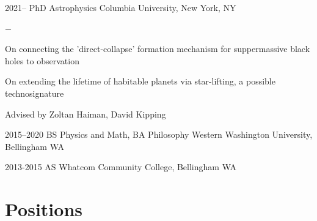 \documentclass[]{scoggins-cv} %
\begin{document}
\begin{entrylist}


    \entry
    {2021--}
    {PhD {\normalfont Astrophysics}}
    {Columbia University, New York, NY}
    {%
        \vspace{-1em}
        \begin{list}{{\color{numcolor}$-$}}{\cvlist}
            \item On connecting the 'direct-collapse' formation mechanism for suppermassive black holes to observation
            \item On extending the lifetime of habitable planets via star-lifting, a possible technosignature
            \item Advised by Zoltan Haiman, David Kipping
        \end{list}
    }


    \entry
    {2015--2020}
    {BS {\normalfont Physics and Math,} BA {\normalfont Philosophy}}
    {Western Washington University, Bellingham WA}


    \entry
    {2013-2015}
    {AS}
    {Whatcom Community College, Bellingham WA}


\end{entrylist}




\section{Positions}
\end{document}
